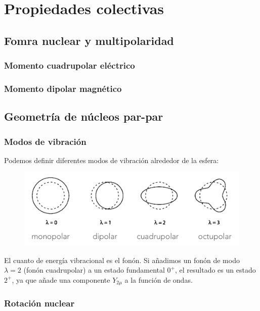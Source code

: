 \chapter{Propiedades colectivas}

\section{Fomra nuclear y multipolaridad}

\subsection{Momento cuadrupolar eléctrico}

\subsection{Momento dipolar magnético}

\section{Geometría de núcleos par-par}

\subsection{Modos de vibración}

Podemos definir diferentes modos de vibración alrededor de la esfera:

\begin{figure}[h!] \centering
    \includegraphics[width=0.9\linewidth]{Cuerpo/Ch_02/02_Modos_Vibracion.png}
\end{figure}
El cuanto de energía vibracional es el fonón. Si añadimos un fonón de modo $\lambda=2$ (fonón cuadrupolar) a un estado fundamental $0^+$, el resultado es un estado $2^+$, ya que añade una componente $Y_{2\mu}$ a la función de ondas. 


\subsection{Rotación nuclear}

